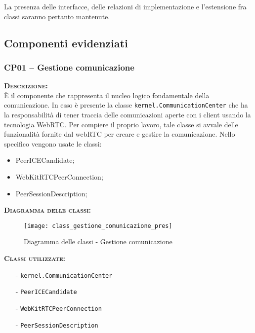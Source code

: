 La presenza delle interfacce, delle relazioni di implementazione e l'estensione fra classi saranno pertanto mantenute.

\subsection{Componenti evidenziati}

\subsubsection{CP01 -- Gestione comunicazione}
\begin{description}
	\item{\scshape\bfseries Descrizione:}\\
È il componente che rappresenta il nucleo logico fondamentale della comunicazione. In esso è presente la classe \texttt{kernel.CommunicationCenter} che ha la responsabilità di tener traccia delle comunicazioni aperte con i client usando la tecnologia WebRTC\@. Per compiere il proprio lavoro, tale classe si avvale delle funzionalità fornite dal webRTC per creare e gestire la comunicazione. Nello specifico vengono usate le classi:

\begin{itemize}
	\item PeerICECandidate;
	\item WebKitRTCPeerConnection;
	\item PeerSessionDescription;
\end{itemize}

	\item{\scshape\bfseries Diagramma delle classi:}
  \begin{figure}[H]
    \centering
    \texttt{[image: class\_gestione\_comunicazione\_pres]}
    \caption{Diagramma delle classi - Gestione comunicazione}\label{fig:gestionecomunicazione}
  \end{figure}

	\item{\scshape\bfseries Classi utilizzate:} 
	\begin{itemize}[noitemsep,nolistsep]
		\item[-] \texttt{kernel.CommunicationCenter}
		\item[-] \texttt{PeerICECandidate}
		\item[-] \texttt{WebKitRTCPeerConnection}
		\item[-] \texttt{PeerSessionDescription}
	\end{itemize}  
\end{description}

